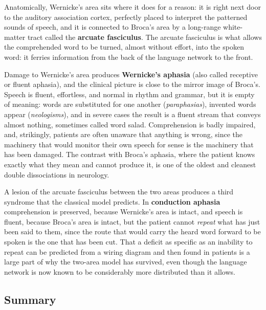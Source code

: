 \documentclass[11pt]{article}
\begin{document}
Anatomically, Wernicke's area sits where it does for a reason: it is right next door to the auditory association cortex, perfectly placed to interpret the patterned sounds of speech, and it is connected to Broca's area by a long-range white-matter tract called the \textbf{arcuate fasciculus}. The arcuate fasciculus is what allows the comprehended word to be turned, almost without effort, into the spoken word: it ferries information from the back of the language network to the front.

Damage to Wernicke's area produces \textbf{Wernicke's aphasia} (also called receptive or fluent aphasia), and the clinical picture is close to the mirror image of Broca's. Speech is fluent, effortless, and normal in rhythm and grammar, but it is empty of meaning: words are substituted for one another (\textit{paraphasias}), invented words appear (\textit{neologisms}), and in severe cases the result is a fluent stream that conveys almost nothing, sometimes called word salad. Comprehension is badly impaired, and, strikingly, patients are often unaware that anything is wrong, since the machinery that would monitor their own speech for sense is the machinery that has been damaged. The contrast with Broca's aphasia, where the patient knows exactly what they mean and cannot produce it, is one of the oldest and cleanest double dissociations in neurology.

A lesion of the arcuate fasciculus between the two areas produces a third syndrome that the classical model predicts. In \textbf{conduction aphasia} comprehension is preserved, because Wernicke's area is intact, and speech is fluent, because Broca's area is intact, but the patient cannot \textit{repeat} what has just been said to them, since the route that would carry the heard word forward to be spoken is the one that has been cut. That a deficit as specific as an inability to repeat can be predicted from a wiring diagram and then found in patients is a large part of why the two-area model has survived, even though the language network is now known to be considerably more distributed than it allows.

\subsection{Summary}
\end{document}
